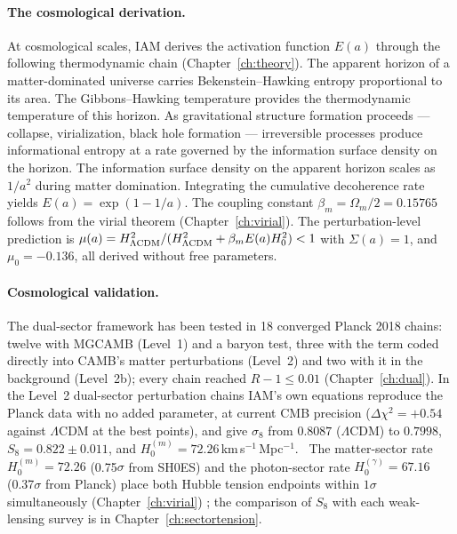\paragraph{The cosmological derivation.} At cosmological scales, IAM derives the activation function $E(a)$ through the following thermodynamic chain
(Chapter~\ref{ch:theory}). The apparent horizon of a matter-dominated universe carries Bekenstein--Hawking entropy proportional to its area. The
Gibbons--Hawking temperature provides the thermodynamic temperature of this horizon. As gravitational structure formation proceeds --- collapse,
virialization, black hole formation --- irreversible processes produce informational entropy at a rate governed by the information surface density on the
horizon. The information surface density on the apparent horizon scales as $1/a^2$ during matter domination. Integrating the cumulative decoherence rate
yields $E(a)=\exp(1-1/a)$. The coupling constant $\beta_m=\Omega_m/2=0.15765$ follows from the virial theorem (Chapter~\ref{ch:virial}). The
perturbation-level prediction is $\mu(a)=H^2_{\Lambda\rm CDM}/(H^2_{\Lambda\rm CDM}+\beta_mE(a)H_0^2)<1$ with $\Sigma(a)=1$, and $\mu_0=-0.136$, all derived
without free parameters. \derived

\paragraph{Cosmological validation.} The dual-sector framework has been tested in 18 converged Planck 2018 chains: twelve with MGCAMB (Level~1) and a baryon
test, three with the term coded directly into CAMB's matter perturbations (Level~2) and two with it in the background (Level~2b); every chain reached
$R-1\le0.01$ (Chapter~\ref{ch:dual}). In the Level~2 dual-sector perturbation chains IAM's own equations reproduce the Planck data with no added parameter, at current CMB precision
($\Delta\chi^2=+0.54$ against $\Lambda$CDM at the best points), and give $\sigma_8$ from $0.8087$ ($\Lambda$CDM) to $0.7998$, $S_8=0.822\pm0.011$, and $H_0^{(m)}=72.26$\,km\,s$^{-1}$\,Mpc$^{-1}$. \measured\ The
matter-sector rate $H_0^{(m)}=72.26$ (0.75$\sigma$ from SH0ES) and the photon-sector rate $H_0^{(\gamma)}=67.16$ (0.37$\sigma$ from Planck) place both Hubble
tension endpoints within $1\sigma$ simultaneously (Chapter~\ref{ch:virial}) \calc; the comparison of $S_8$ with each weak-lensing survey is in
Chapter~\ref{ch:sectortension}.

